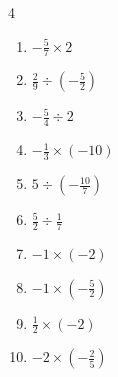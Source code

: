 


\setcounter{quesnum}{40}

\begin{multicols}{4}
\begin{enumerate}
  \itemsep=18pt
  \item $\displaystyle -\frac{5}{7}\times{}2$


  \item $\displaystyle \frac{2}{9}\div{}\left(-\frac{5}{2}\right)$


  \item $\displaystyle -\frac{5}{4}\div{}2$


  \item $\displaystyle -\frac{1}{3}\times{}\left(-10\right)$


  \item $\displaystyle 5\div{}\left(-\frac{10}{7}\right)$


  \item $\displaystyle \frac{5}{2}\div{}\frac{1}{7}$


  \item $\displaystyle -1\times{}\left(-2\right)$

        \phantom{$\displaystyle =2$}

  \item $\displaystyle -1\times{}\left(-\frac{5}{2}\right)$


  \item $\displaystyle \frac{1}{2}\times{}\left(-2\right)$

        \phantom{$\displaystyle =-1$}

  \item $\displaystyle -2\times{}\left(-\frac{2}{5}\right)$


\columnbreak %


\end{enumerate}
\end{multicols}
